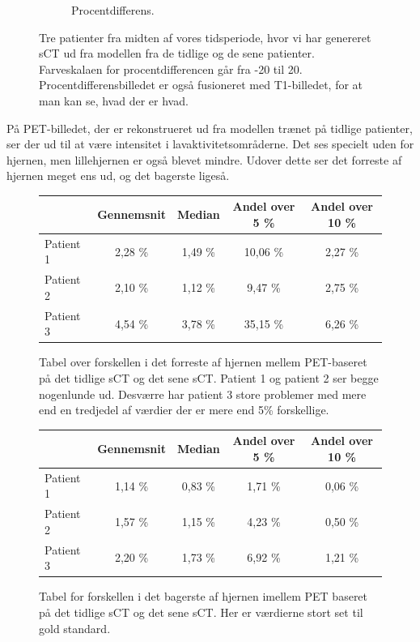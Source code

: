 \begin{figure}
\begin{subfigure}{0.3\textwidth}
        \caption{Procentdifferens.}
        \label{col:over_time_pet_pat3_pd}
    \end{subfigure}
    \caption{Tre patienter fra midten af vores tidsperiode, hvor vi har genereret sCT ud fra modellen fra de tidlige og de sene patienter. Farveskalaen for procentdifferencen går fra -20 til 20. Procentdifferensbilledet er også fusioneret med T1-billedet, for at man kan se, hvad der er hvad.}
    \label{col:over_time_pet}
\end{figure}


På PET-billedet, der er rekonstrueret ud fra modellen trænet på tidlige
patienter, ser der ud til at være 
 intensitet i
lavaktivitetsområderne. Det ses specielt uden for hjernen, men
lillehjernen er også blevet mindre. Udover dette ser det forreste af
hjernen meget ens ud, og det bagerste ligeså.

\begin{figure}
    \centering
    \begin{tabular}{| l | c | c | c | c |}
        \hline
         & Gennemsnit & Median & Andel over 5 \% & Andel over 10 \% \\ \hline
        Patient 1 & 2,28 \% & 1,49 \% & 10,06 \% & 2,27 \% \\ \hline
        Patient 2 & 2,10 \% & 1,12 \% & 9,47 \% & 2,75 \% \\ \hline
        Patient 3 & 4,54 \% & 3,78 \% & 35,15 \% & 6,26 \% \\ \hline
    \end{tabular}
    \caption{Tabel over forskellen i det forreste af hjernen mellem PET-baseret på det tidlige sCT og det sene sCT. Patient 1 og patient 2 ser begge nogenlunde ud. Desværre har patient 3 store problemer med mere end en tredjedel af værdier der er mere end 5\% forskellige.}
    \label{tab:over_tid_forresthjerne}
\end{figure}

\begin{figure}
    \centering
    \begin{tabular}{| l | c | c | c | c |}
        \hline
         & Gennemsnit & Median & Andel over 5 \% & Andel over 10 \% \\ \hline
        Patient 1 & 1,14 \% & 0,83 \% & 1,71 \% & 0,06 \% \\ \hline
        Patient 2 & 1,57 \% & 1,15 \% & 4,23 \% & 0,50 \% \\ \hline
        Patient 3 & 2,20 \% & 1,73 \% & 6,92 \% & 1,21 \% \\ \hline
    \end{tabular}
    \caption{Tabel for forskellen i det bagerste af hjernen imellem PET baseret på det tidlige sCT og det sene sCT. Her er værdierne stort set til gold standard.}
    \label{tab:over_tid_bagersthjerne}
\end{figure}


